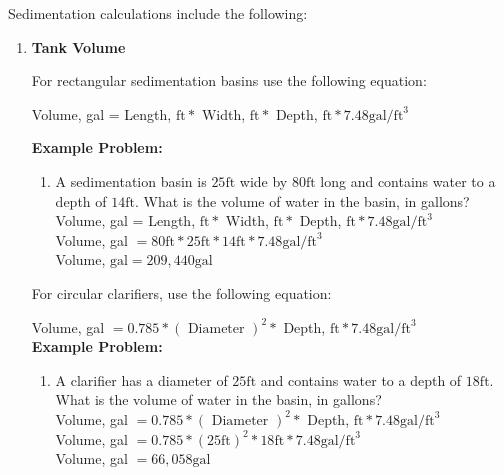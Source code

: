 Sedimentation calculations include the following:
\begin{enumerate}
\item \textbf{Tank Volume}

For rectangular sedimentation basins use the following equation:

Volume, gal = Length, $\mathrm{ft} *$ Width, $\mathrm{ft} *$ Depth, $\mathrm{ft} * 7.48 \mathrm{gal} / \mathrm{ft}^{3}$

\textbf{Example Problem:}\\
\begin{enumerate}[1.]
\item A sedimentation basin is $25 \mathrm{ft}$ wide by $80 \mathrm{ft}$ long and contains water to a depth of $14 \mathrm{ft}$. What is the volume of water in the basin, in gallons?\\
\vspace{0.2cm}
Volume, gal = Length, $\mathrm{ft} *$ Width, $\mathrm{ft} *$ Depth, $\mathrm{ft} * 7.48 \mathrm{gal} / \mathrm{ft}^{3}$\\
\vspace{0.2cm}
Volume, gal $=80 \mathrm{ft} * 25 \mathrm{ft} * 14 \mathrm{ft} * 7.48 \mathrm{gal} / \mathrm{ft}^{3}$\\
\vspace{0.2cm}
Volume, $\mathrm{gal}=209,440 \mathrm{gal}$\\
\end{enumerate}



For circular clarifiers, use the following equation:

Volume, gal $=0.785 *(\text { Diameter })^{2} *$ Depth, $\mathrm{ft} * 7.48 \mathrm{gal} / \mathrm{ft}^{3}$\\
\vspace{0.2cm}
\textbf{Example Problem:}\\
\begin{enumerate}[1.]
\item A clarifier has a diameter of $25 \mathrm{ft}$ and contains water to a depth of $18 \mathrm{ft}$. What is the volume of water in the basin, in gallons?\\
\vspace{0.2cm}
Volume, gal $=0.785 *(\text { Diameter })^{2} *$ Depth, $\mathrm{ft} * 7.48 \mathrm{gal} / \mathrm{ft}^{3}$\\
\vspace{0.2cm}
Volume, gal $=0.785 *(25 \mathrm{ft})^{2} * 18 \mathrm{ft} * 7.48 \mathrm{gal} / \mathrm{ft}^{3}$\\
\vspace{0.2cm}
Volume, gal $=66,058 \mathrm{gal}$


\end{enumerate}
\end{enumerate}
